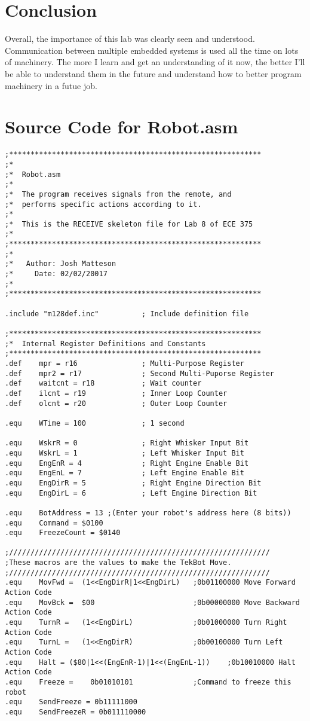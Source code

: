 \documentclass[12pt,letterpaper]{article}
\begin{document}
\section{Conclusion}
Overall, the importance of this lab was clearly seen and understood. Communication between multiple embedded systems is used all the time on lots of machinery. 
The more I learn and get an understanding of it now, the better I'll be able to understand them in the future and understand how to better program machinery 
in a futue job.

\section{Source Code for Robot.asm}
\scriptsize{\begin{verbatim}
;***********************************************************
;*
;*	Robot.asm
;*
;*	The program receives signals from the remote, and 
;* 	performs specific actions according to it.
;*
;*	This is the RECEIVE skeleton file for Lab 8 of ECE 375
;*
;***********************************************************
;*
;*	 Author: Josh Matteson
;*	   Date: 02/02/20017
;*
;***********************************************************

.include "m128def.inc"			; Include definition file

;***********************************************************
;*	Internal Register Definitions and Constants
;***********************************************************
.def	mpr = r16				; Multi-Purpose Register
.def 	mpr2 = r17				; Second Multi-Puporse Register
.def 	waitcnt = r18			; Wait counter
.def	ilcnt = r19				; Inner Loop Counter
.def	olcnt = r20				; Outer Loop Counter

.equ 	WTime = 100				; 1 second

.equ	WskrR = 0				; Right Whisker Input Bit
.equ	WskrL = 1				; Left Whisker Input Bit
.equ	EngEnR = 4				; Right Engine Enable Bit
.equ	EngEnL = 7				; Left Engine Enable Bit
.equ	EngDirR = 5				; Right Engine Direction Bit
.equ	EngDirL = 6				; Left Engine Direction Bit

.equ	BotAddress = 13 ;(Enter your robot's address here (8 bits))
.equ 	Command = $0100
.equ	FreezeCount = $0140

;/////////////////////////////////////////////////////////////
;These macros are the values to make the TekBot Move.
;/////////////////////////////////////////////////////////////
.equ	MovFwd =  (1<<EngDirR|1<<EngDirL)	;0b01100000 Move Forward Action Code
.equ	MovBck =  $00						;0b00000000 Move Backward Action Code
.equ	TurnR =   (1<<EngDirL)				;0b01000000 Turn Right Action Code
.equ	TurnL =   (1<<EngDirR)				;0b00100000 Turn Left Action Code
.equ	Halt = ($80|1<<(EngEnR-1)|1<<(EngEnL-1))	;0b10010000 Halt Action Code
.equ 	Freeze = 	0b01010101				;Command to freeze this robot
.equ 	SendFreeze = 0b11111000
.equ 	SendFreezeR = 0b011110000


\end{verbatim}}
\end{document}
